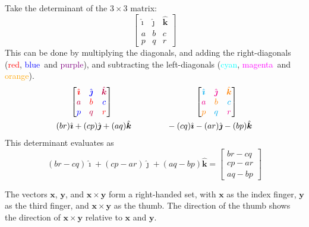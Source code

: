 \documentclass[11pt, a4paper]{article}
\begin{document}
\noindent Take the determinant of the $3\times3$ matrix:
\begin{equation*}
\begin{bmatrix} \hat{\boldsymbol{\imath}} & \hat{\boldsymbol{\jmath}} & \hat{\boldsymbol{k}} \\ a & b & c \\ p & q & r \end{bmatrix}
\end{equation*}
This can be done by multiplying the diagonals, and adding the right-diagonals (\textcolor{red}{red}, \textcolor{blue}{blue}\ and \textcolor{purple}{purple}), and subtracting the left-diagonals (\textcolor{cyan}{cyan}, \textcolor{magenta}{magenta}\ and \textcolor{orange}{orange}).
\begin{gather*}
\begin{bmatrix} \textcolor{red}{\hat{\boldsymbol{\imath}}} & \textcolor{blue}{\hat{\boldsymbol{\jmath}}} & \textcolor{purple}{\hat{\boldsymbol{k}}} \\ \textcolor{purple}{a} & \textcolor{red}{b} & \textcolor{blue}{c} \\ \textcolor{blue}{p} & \textcolor{purple}{q} & \textcolor{red}{r} \end{bmatrix}\hspace{3.5cm}\begin{bmatrix} \textcolor{cyan}{\hat{\boldsymbol{\imath}}} & \textcolor{magenta}{\hat{\boldsymbol{\jmath}}} & \textcolor{orange}{\hat{\boldsymbol{k}}} \\ \textcolor{magenta}{a} & \textcolor{orange}{b} & \textcolor{cyan}{c} \\ \textcolor{orange}{p} & \textcolor{cyan}{q} & \textcolor{magenta}{r} \end{bmatrix} \\
(br)\hat{\boldsymbol{\imath}}+(cp)\hat{\boldsymbol{\jmath}}+(aq)\hat{\boldsymbol{k}} \hspace{1.5cm} -(cq)\hat{\boldsymbol{\imath}}-(ar)\hat{\boldsymbol{\jmath}}-(bp)\hat{\boldsymbol{k}} 
\end{gather*}
This determinant evaluates as
\begin{equation*}
(br-cq)\hat{\boldsymbol{\imath}}+(cp-ar)\hat{\boldsymbol{\jmath}}+(aq-bp)\hat{\boldsymbol{k}}=\begin{bmatrix}br-cq\\cp-ar\\aq-bp\end{bmatrix}
\end{equation*}

The vectors $\boldsymbol{x}$, $\boldsymbol{y}$, and $\boldsymbol{x}\times\boldsymbol{y}$ form a right-handed set, with $\boldsymbol{x}$ as the index finger, $\boldsymbol{y}$ as the third finger, and $\boldsymbol{x}\times\boldsymbol{y}$ as the thumb. The direction of the thumb shows the direction of $\boldsymbol{x}\times\boldsymbol{y}$ relative to $\boldsymbol{x}$ and $\boldsymbol{y}$. \newline \par
\end{document}
